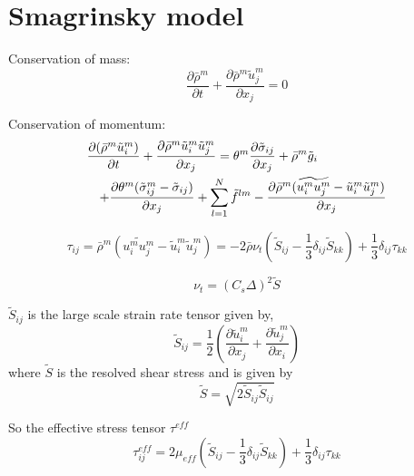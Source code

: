 \documentclass[12pt,titlepage]{article}
\begin{document}
\section{Smagrinsky model}
Conservation of mass:
\begin{equation}
    \frac{\partial \bar{\rho}^m}{\partial t} + \frac{\partial \bar{\rho}^m \tilde{u}_j^m}
    {\partial x_j}=0
\label{eq:lesmass}
\end{equation}

Conservation of momentum:
\begin{eqnarray}
    \lefteqn{\frac{\partial (\bar{\rho}^m \tilde{u}_i^m)}{\partial t} +
    \frac{\partial \bar{\rho}^m \tilde{u}_i^m \tilde{u}_j^m}{\partial x_j} =
    \theta^m \frac{\partial \tilde{\sigma}_{ij}}{\partial x_j} +\bar{\rho}^m \tilde{g}_i\nonumber}\\
    & & +\frac{\partial \theta^m (\tilde{\sigma}_{ij}^m-\tilde{\sigma}_{ij})}{\partial x_j}
    +\sum_{l=1}^N \tilde{f}^{lm}
    -\frac{\partial{\bar{\rho}^m (\widetilde{u_i^m u_j^m}-\tilde{u}_i^m \tilde{u}_j^m})}{\partial x_j}
\label{eq:lesmom}
\end{eqnarray}

\begin{displaymath}
\tau_{ij}=\bar{\rho}^m(\widetilde{u_i^m u_j^m}-\tilde{u}_i^m \tilde{u}_j^m) =
           - 2 \bar{\rho} \nu_t (\tilde{S}_{ij}-\frac{1}{3} \delta_{ij}\tilde{S}_{kk})
	   + \frac{1}{3} \delta_{ij}\tau_{kk}
\end{displaymath}

\begin{equation}
\nu_t = (C_s \Delta)^2\tilde{S} \label{eq:turbviscosity}
\end{equation}

$\tilde{S}_{ij}$ is the large scale strain rate tensor given by,
\begin{displaymath}
\tilde{S}_{ij}=\frac{1}{2} (\frac{\partial \tilde{u}_i^m}{\partial x_j}
               +\frac{\partial \tilde{u}_j^m}{\partial x_i})
\end{displaymath}
where $\tilde{S}$ is the resolved shear stress and is given by
\begin{displaymath}
\tilde{S}=\sqrt{2 \tilde{S}_{ij} \tilde{S}_{ij}}
\end{displaymath}

So the effective stress tensor $\tau^{eff}$
\begin{displaymath}
\tau_{ij}^{eff}=2 \mu_{eff} (\tilde{S}_{ij}-\frac{1}{3} \delta_{ij}\tilde{S}_{kk})
                + \frac{1}{3} \delta_{ij}\tau_{kk}
\end{displaymath}
\end{document}
